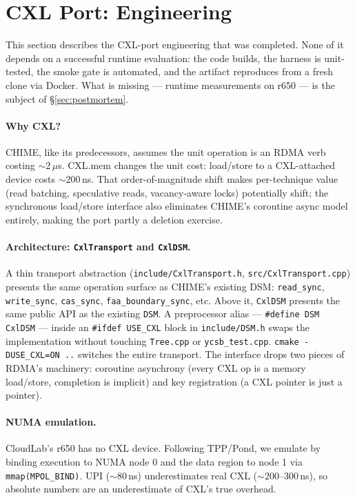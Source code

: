 \documentclass[11pt,a4paper]{article}
\begin{document}
\section{CXL Port: Engineering}
\label{sec:cxl-engineering}

This section describes the CXL-port engineering that was completed. None of it depends on a successful runtime evaluation: the code builds, the harness is unit-tested, the smoke gate is automated, and the artifact reproduces from a fresh clone via Docker. What is missing --- runtime measurements on r650 --- is the subject of §\ref{sec:postmortem}.

\paragraph{Why CXL?} CHIME, like its predecessors, assumes the unit operation is an RDMA verb costing $\sim 2\,\mu$s. CXL.mem changes the unit cost: load/store to a CXL-attached device costs $\sim 200$\,ns. That order-of-magnitude shift makes per-technique value (read batching, speculative reads, vacancy-aware locks) potentially shift; the synchronous load/store interface also eliminates CHIME's coroutine async model entirely, making the port partly a deletion exercise.

\paragraph{Architecture: \texttt{CxlTransport} and \texttt{CxlDSM}.} A thin transport abstraction (\texttt{include/CxlTransport.h}, \texttt{src/CxlTransport.cpp}) presents the same operation surface as CHIME's existing DSM: \texttt{read\_sync}, \texttt{write\_sync}, \texttt{cas\_sync}, \texttt{faa\_boundary\_sync}, etc. Above it, \texttt{CxlDSM} presents the same public API as the existing \texttt{DSM}. A preprocessor alias --- \texttt{\#define DSM CxlDSM} --- inside an \texttt{\#ifdef USE\_CXL} block in \texttt{include/DSM.h} swaps the implementation without touching \texttt{Tree.cpp} or \texttt{ycsb\_test.cpp}. \texttt{cmake -DUSE\_CXL=ON ..} switches the entire transport. The interface drops two pieces of RDMA's machinery: coroutine asynchrony (every CXL op is a memory load/store, completion is implicit) and key registration (a CXL pointer is just a pointer).

\paragraph{NUMA emulation.} CloudLab's r650 has no CXL device. Following TPP/Pond, we emulate by binding execution to NUMA node 0 and the data region to node 1 via \texttt{mmap(MPOL\_BIND)}. UPI ($\sim$80\,ns) underestimates real CXL ($\sim$200--300\,ns), so absolute numbers are an underestimate of CXL's true overhead.
\end{document}
